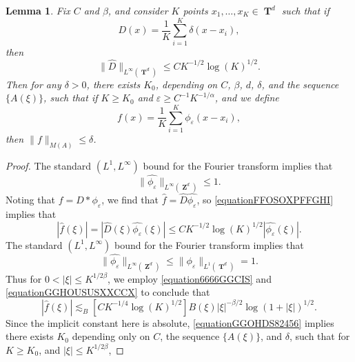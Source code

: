 \documentclass[12pt,reqno]{article}
\numberwithin{equation}{section}
\DeclareMathOperator{\ZZ}{\mathbf{Z}}
\DeclareMathOperator{\TT}{\mathbf{T}}
\newtheorem{lemma}[theorem]{Lemma}
\begin{document}
\begin{lemma}
    Fix $C$ and $\beta$, and consider $K$ points $x_1, \dots, x_K \in \TT^d$ such that if
    \[ D(x) = \frac{1}{K} \sum_{i = 1}^K \delta(x - x_i), \]
    then
    \begin{equation} \label{equationFFOSOXPFFGHI}
        \| \widehat{D} \|_{L^\infty(\TT^d)} \leq C K^{-1/2} \log(K)^{1/2}.
    \end{equation}
    Then for any $\delta > 0$, there exists $K_0$, depending on $C$, $\beta$, $d$, $\delta$, and the sequence $\{ A(\xi) \}$, such that if $K \geq K_0$ and $\varepsilon \geq C^{-1} K^{-1/\alpha}$, and we define
    \[ f(x) = \frac{1}{K} \sum_{i = 1}^K \phi_\varepsilon(x - x_i), \]
    then $\| f \|_{M(A)} \leq \delta$.
\end{lemma}
\begin{proof}
    The standard $(L^1,L^\infty)$ bound for the Fourier transform implies that
    \begin{equation}
        \| \widehat{\phi_\varepsilon} \|_{L^\infty(\ZZ^d)} \leq 1.
    \end{equation}
    Noting that $f = D * \phi_\varepsilon$, we find that $\widehat{f} = \widehat{D} \widehat{\phi_\varepsilon}$, so \eqref{equationFFOSOXPFFGHI} implies that
    \begin{equation} \label{equation6666GGCIS}
        |\widehat{f}(\xi)| = |\widehat{D}(\xi) \widehat{\phi_\varepsilon}(\xi)| \leq C K^{-1/2} \log(K)^{1/2} |\widehat{\phi_\varepsilon}(\xi)|.
    \end{equation}
    The standard $(L^1,L^\infty)$ bound for the Fourier transform implies that
    \begin{equation} \label{equationGGHOUSUSXXCCX}
        \| \widehat{\phi_\varepsilon} \|_{L^\infty(\ZZ^d)} \leq \| \phi_\varepsilon \|_{L^1(\TT^d)} = 1.
    \end{equation}
    Thus for $0 < |\xi| \leq K^{1/2\beta}$, we employ \eqref{equation6666GGCIS} and \eqref{equationGGHOUSUSXXCCX} to conclude that
    \begin{equation} \label{equationGGOHDS82456}
        |\widehat{f}(\xi)| \lesssim_B \left[ C K^{-1/4} \log(K)^{1/2} \right] B(\xi) |\xi|^{-\beta/2} \log(1 + |\xi|)^{1/2}.
    \end{equation}
    Since the implicit constant here is absolute, \eqref{equationGGOHDS82456} implies there exists $K_0$ depending only on $C$, the sequence $\{ A(\xi) \}$, and $\delta$, such that for $K \geq K_0$, and $|\xi| \leq K^{1/2\beta}$,

\end{proof}
\end{document}
